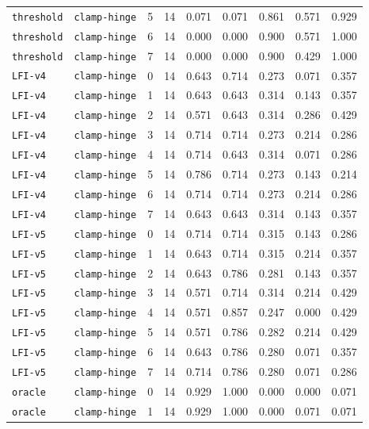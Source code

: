 \documentclass{article}
\begin{document}
\begin{center}
{\begin{tabular}{llllccccc}
\texttt{threshold} & \texttt{clamp-hinge} & 5 & 14 & 0.071 & 0.071 & 0.861 & 0.571 & 0.929 \\
\texttt{threshold} & \texttt{clamp-hinge} & 6 & 14 & 0.000 & 0.000 & 0.900 & 0.571 & 1.000 \\
\texttt{threshold} & \texttt{clamp-hinge} & 7 & 14 & 0.000 & 0.000 & 0.900 & 0.429 & 1.000 \\
\texttt{LFI-v4} & \texttt{clamp-hinge} & 0 & 14 & 0.643 & 0.714 & 0.273 & 0.071 & 0.357 \\
\texttt{LFI-v4} & \texttt{clamp-hinge} & 1 & 14 & 0.643 & 0.643 & 0.314 & 0.143 & 0.357 \\
\texttt{LFI-v4} & \texttt{clamp-hinge} & 2 & 14 & 0.571 & 0.643 & 0.314 & 0.286 & 0.429 \\
\texttt{LFI-v4} & \texttt{clamp-hinge} & 3 & 14 & 0.714 & 0.714 & 0.273 & 0.214 & 0.286 \\
\texttt{LFI-v4} & \texttt{clamp-hinge} & 4 & 14 & 0.714 & 0.643 & 0.314 & 0.071 & 0.286 \\
\texttt{LFI-v4} & \texttt{clamp-hinge} & 5 & 14 & 0.786 & 0.714 & 0.273 & 0.143 & 0.214 \\
\texttt{LFI-v4} & \texttt{clamp-hinge} & 6 & 14 & 0.714 & 0.714 & 0.273 & 0.214 & 0.286 \\
\texttt{LFI-v4} & \texttt{clamp-hinge} & 7 & 14 & 0.643 & 0.643 & 0.314 & 0.143 & 0.357 \\
\texttt{LFI-v5} & \texttt{clamp-hinge} & 0 & 14 & 0.714 & 0.714 & 0.315 & 0.143 & 0.286 \\
\texttt{LFI-v5} & \texttt{clamp-hinge} & 1 & 14 & 0.643 & 0.714 & 0.315 & 0.214 & 0.357 \\
\texttt{LFI-v5} & \texttt{clamp-hinge} & 2 & 14 & 0.643 & 0.786 & 0.281 & 0.143 & 0.357 \\
\texttt{LFI-v5} & \texttt{clamp-hinge} & 3 & 14 & 0.571 & 0.714 & 0.314 & 0.214 & 0.429 \\
\texttt{LFI-v5} & \texttt{clamp-hinge} & 4 & 14 & 0.571 & 0.857 & 0.247 & 0.000 & 0.429 \\
\texttt{LFI-v5} & \texttt{clamp-hinge} & 5 & 14 & 0.571 & 0.786 & 0.282 & 0.214 & 0.429 \\
\texttt{LFI-v5} & \texttt{clamp-hinge} & 6 & 14 & 0.643 & 0.786 & 0.280 & 0.071 & 0.357 \\
\texttt{LFI-v5} & \texttt{clamp-hinge} & 7 & 14 & 0.714 & 0.786 & 0.280 & 0.071 & 0.286 \\
\texttt{oracle} & \texttt{clamp-hinge} & 0 & 14 & 0.929 & 1.000 & 0.000 & 0.000 & 0.071 \\
\texttt{oracle} & \texttt{clamp-hinge} & 1 & 14 & 0.929 & 1.000 & 0.000 & 0.071 & 0.071 \\
\bottomrule
\end{tabular}%
}
\end{center}
\end{document}
